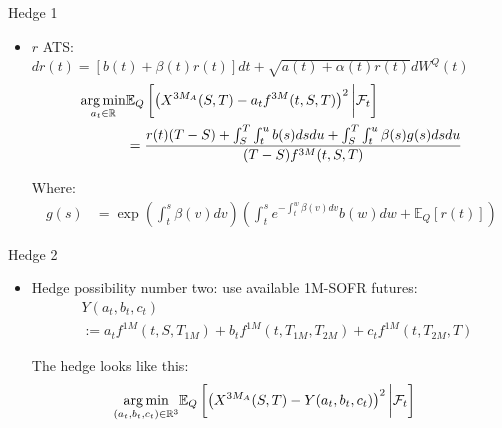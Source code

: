 \documentclass[UKenglish]{beamer}
\newcommand{\E}{\mathbb{E}}  %
\newcommand{\F}{\mathcal{F}} %
\newcommand{\R}{\mathbb{R}}  %
\begin{document}
\begin{frame}{Hedge 1}
\begin{itemize}
    \item $r$ ATS: $dr(t) = [b(t) + \beta(t)r(t)]dt + \sqrt{a(t) + \alpha(t)r(t)}dW^{Q}(t)$ 
\begin{align*}
\underset{a_{t}\in \R}{\arg\min}
&\E_{Q}\left[
\left(
X^{3M_{A}}(S,T)-a_{t}f^{3M}(t,S,T)
\right)^{2}
\bigg{|}\F_{t}
\right] \\ 
&= 
\frac{
r(t)(T-S)
+ \int_{S}^{T}\int_{t}^{u}b(s)dsdu 
+ \int_{S}^{T}\int_{t}^{u}\beta(s)g(s)dsdu
}{
(T-S)f^{3M}(t,S,T)
}
\end{align*}

Where: 
\begin{align*}
g(s) &= \exp\left(
\int_{t}^{s}\beta(v)dv
\right)
\left(
\int_{t}^{s}e^{-\int_{t}^{w}\beta(v)dv}b(w)dw + \E_{Q}[r(t)]
\right) 
\end{align*}

\end{itemize}
\end{frame}


\begin{frame}{Hedge 2}
\begin{itemize}
    \item Hedge possibility number two: use available 1M-SOFR futures: 
\begin{align*}
&Y(a_{t}, b_{t}, c_{t}) \\
&:= 
a_{t}f^{1M}(t,S,T_{1M}) + 
b_{t}f^{1M}(t,T_{1M}, T_{2M}) + 
c_{t}f^{1M}(t,T_{2M}, T)
\end{align*}





The hedge looks like this: 
\begin{align*}
\underset{(a_{t}, b_{t}, c_{t})\in \R^{3}}{\arg\min}
&\E_{Q}\left[
\left(
X^{3M_{A}}(S,T)-Y(a_{t}, b_{t}, c_{t})
\right)^{2}
\bigg{|}\F_{t}
\right]    
\end{align*}
\end{itemize}
\end{frame}
\end{document}
